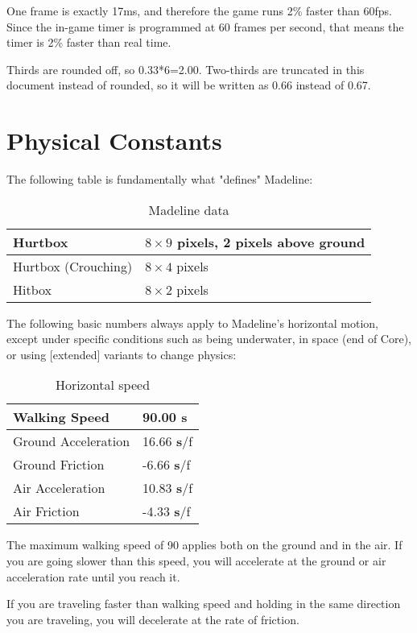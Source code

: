 \documentclass[oneside]{book}
\newcommand{\s}{\textbf{s}}
\begin{document}
One frame is exactly 17ms, and therefore the game runs 2\% faster than 60fps. Since the in-game timer is programmed at 60 frames per second, that means the timer is 2\% faster than real time.

Thirds are rounded off, so 0.33*6=2.00. Two-thirds are truncated in this document instead of rounded, so it will be written as 0.66 instead of 0.67.

\section{Physical Constants}

The following table is fundamentally what "defines" Madeline:

\begin{table}[h]
\begin{tabular}{|l|l|}
\hline
Hurtbox&\makecell[l]{$8\times9$ pixels,\\ 2 pixels above ground}\\
\hline
Hurtbox (Crouching)&$8\times 4$ pixels\\
\hline
Hitbox&$8\times 2$ pixels\\
\hline
\end{tabular}
\caption{Madeline data}
\end{table}

The following basic numbers always apply to Madeline's horizontal motion, except under specific conditions such as being underwater, in space (end of Core), or using [extended] variants to change physics:

\begin{table}[h]
\begin{tabular}{|l|l|}
\hline
Walking Speed&90.00 \s\\
\hline
Ground Acceleration&16.66 \s/f\\
\hline
Ground Friction&-6.66 \s/f\\
\hline
Air Acceleration&10.83 \s/f\\
\hline
Air Friction&-4.33 \s/f\\
\hline
\end{tabular}
\caption{Horizontal speed}
\end{table}

The maximum walking speed of 90 applies both on the ground and in the air. If you are going slower than this speed, you will accelerate at the ground or air acceleration rate until you reach it.

If you are traveling faster than walking speed and holding in the same direction you are traveling, you will decelerate at the rate of friction.
\end{document}
